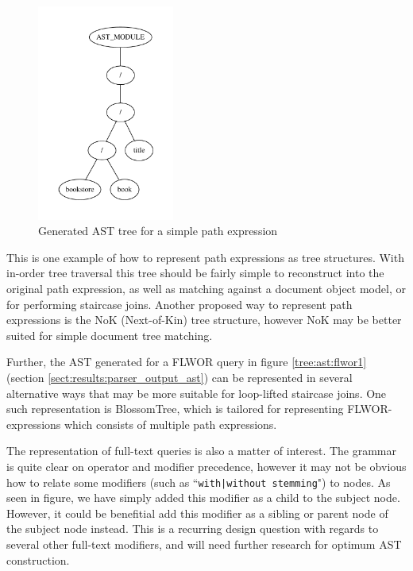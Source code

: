 \begin{figure}[h!]
\centering
 \includegraphics[width=0.4\textwidth]{img/graphs/path1}
\caption{Generated AST tree for a simple path expression}
\label{fig:discussion:ast:path1}
\end{figure}

This is one example of how to represent path expressions as tree structures.
With in-order tree traversal this tree should be fairly simple to reconstruct  
into the original path expression, as well as matching against a document object
model, or for performing staircase joins\cite{pathfinder_staircase}. Another  
proposed way to represent path expressions is the NoK (Next-of-Kin) tree
structure\cite{zhang_nok}, however NoK may be better suited for simple document
tree matching.

Further, the AST generated for a FLWOR query in figure \ref{tree:ast:flwor1}
(section \ref{sect:results:parser_output_ast}) can be represented in several
alternative ways that may be more suitable for loop-lifted staircase
joins\cite{pathfinder_staircase}. One such representation is
BlossomTree\cite{zhang_blossomtree}, which is tailored for representing
FLWOR-expressions which consists of multiple path expressions.

The representation of full-text queries is also a matter of interest. The
grammar is quite clear on operator and modifier precedence, however it may not
be obvious how to relate some modifiers (such as 
``\verb!with|without stemming!") to nodes. As seen in figure, we have simply
added this modifier as a child to the subject node. However, it could be
benefitial add this modifier as a sibling or parent node of the subject node
instead. This is a recurring design question with regards to several other
full-text modifiers, and will need further research for optimum AST
construction.

